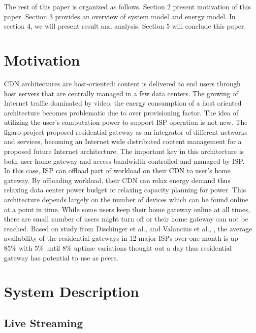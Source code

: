 \documentclass[conference]{IEEEtran}
\begin{document}
The rest of this paper is organized as follows. 
Section 2 present motivation of this paper.
Section 3 provides an overview of system model and energy model.  
In section 4, we will present result and analysis.  
Section 5 will conclude this paper. 

\section{Motivation}\label{motivation}
CDN architectures are host-oriented: content is delivered to end users through host servers that are centrally managed in a few data centers.
The growing of Internet traffic dominated by video, the energy consumption of a host oriented architecture becomes problematic due to over provisioning factor.
The idea of utilizing the user's computation power to support ISP operation is not new. 
The figaro project proposed residential gateway as an integrator of different networks and services, becoming an Internet wide distributed content management for a proposed future Internet architecture.  
The important key in this architecture is both user home gateway and access bandwidth controlled and managed by ISP.
In this case, ISP can offload part of workload on their CDN to user's home gateway.  
By offloading workload, their CDN can relax energy demand thus relaxing data center power budget or relaxing capacity planning for power.
This architecture depends largely on the number of devices which can be found online at a point in time.
While some users keep their home gateway online at all times, there are small number of users might turn off or their home gateway can not be reached.
Based on study from Dischinger et al., \cite{Dischinger:2007:CRB:1298306.1298313} and Valancius et al., \cite{valancius2009greening}, the average availability of the residential gateways in 12 major ISPs over one month is up $85\%$ with $5\%$ until $8\%$ uptime variations thought out a day thus residential gateway has potential to use as peers.

\section{System Description}\label{system model}
\subsection{Live Streaming}
\end{document}
